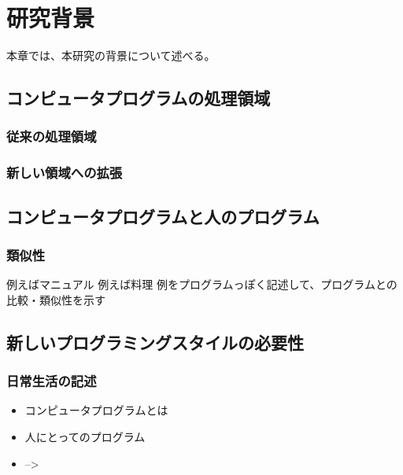 \chapter{研究背景}
\label{chap:background}

本章では、本研究の背景について述べる。

\section{コンピュータプログラムの処理領域}\label{ux30b3ux30f3ux30d4ux30e5ux30fcux30bfux30d7ux30edux30b0ux30e9ux30e0ux306eux51e6ux7406ux9818ux57df}

\subsection{従来の処理領域}\label{ux5f93ux6765ux306eux51e6ux7406ux9818ux57df}

\subsection{新しい領域への拡張}\label{ux65b0ux3057ux3044ux9818ux57dfux3078ux306eux62e1ux5f35}

\section{コンピュータプログラムと人のプログラム}\label{ux30b3ux30f3ux30d4ux30e5ux30fcux30bfux30d7ux30edux30b0ux30e9ux30e0ux3068ux4ebaux306eux30d7ux30edux30b0ux30e9ux30e0}

\subsection{類似性}\label{ux985eux4f3cux6027}

例えばマニュアル 例えば料理
例をプログラムっぽく記述して、プログラムとの比較・類似性を示す

\section{新しいプログラミングスタイルの必要性}\label{ux65b0ux3057ux3044ux30d7ux30edux30b0ux30e9ux30dfux30f3ux30b0ux30b9ux30bfux30a4ux30ebux306eux5fc5ux8981ux6027}

\subsection{日常生活の記述}\label{ux65e5ux5e38ux751fux6d3bux306eux8a18ux8ff0}

\begin{itemize}
\item
  コンピュータプログラムとは
\item
  人にとってのプログラム
\item
  --\textgreater{}
\end{itemize}

